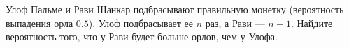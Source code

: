 \documentclass{article}
\begin{document}
Улоф Пальме и Рави Шанкар подбрасывают правильную монетку (вероятность выпадения орла $0.5$). Улоф подбрасывает ее $n$ раз, а Рави --- $n+1$. Найдите вероятность того, что у Рави будет больше орлов, чем у Улофа.
\end{document}
